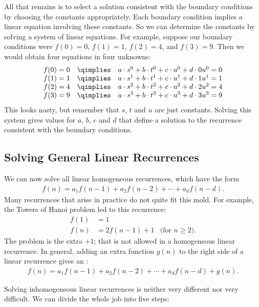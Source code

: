 All that remains is to select a solution consistent with the boundary
conditions by choosing the constants appropriately.  Each boundary
condition implies a linear equation involving these constants.  So we
can determine the constants by solving a system of linear
equations.  For example, suppose our boundary conditions were $f(0) =
0$, $f(1) = 1$, $f(2) = 4$, and $f(3) = 9$.  Then we would obtain four
equations in four unknowns:
\[
\begin{array}{r@{\quad\qimplies\quad}l}
f(0) = 0 & a \cdot s^0 + b \cdot t^0 + c \cdot u^0 + d \cdot 0u^0 = 0 \\
f(1) = 1 & a \cdot s^1 + b \cdot t^1 + c \cdot u^1 + d \cdot 1u^1 = 1 \\
f(2) = 4 & a \cdot s^2 + b \cdot t^2 + c \cdot u^2 + d \cdot 2u^2 = 4 \\
f(3) = 9 & a \cdot s^3 + b \cdot t^3 + c \cdot u^3 + d \cdot 3u^3 = 9
\end{array}
\]
This looks nasty, but remember that $s$, $t$ and $u$ are just
constants.  Solving this system gives values for $a$, $b$, $c$ and $d$
that define a solution to the recurrence consistent with the boundary
conditions.

\subsection{Solving General Linear Recurrences}

We can now solve all linear homogeneous recurrences, which have the
form
\begin{align*}
f(n) = a_1 f(n-1) + a_2 f(n-2) + \cdots + a_d f(n - d).
\end{align*}
Many recurrences that arise in practice do not quite fit this mold.
For example, the Towers of Hanoi problem led to this recurrence:
\begin{align*}
f(1) & = 1 \\
f(n) & = 2 f(n - 1) + 1 & \text{(for $n \geq 2$)}.
\end{align*}
The problem is the extra $+1$; that is not allowed in a homogeneous
linear recurrence.  In general, adding an extra function $g(n)$ to the
right side of a linear recurrence gives an :
\begin{align*}
f(n) = a_1 f(n-1) + a_2 f(n-2) + \cdots + a_d f(n - d) + g(n).
\end{align*}

Solving inhomogeneous linear recurrences is neither very different nor
very difficult.  We can divide the whole job into five steps:

